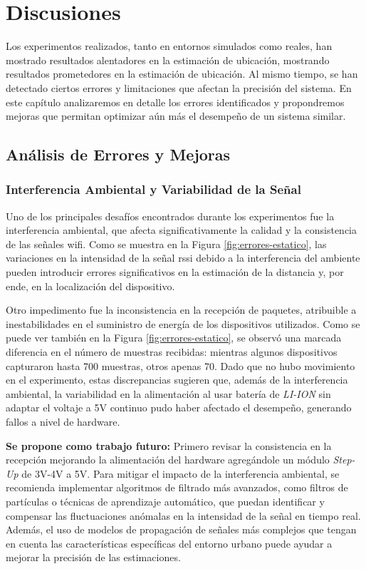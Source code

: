 \chapter{Discusiones}
\label{Cap_Errores}
\label{Capitulo_5}

Los experimentos realizados, tanto en entornos simulados como reales, han mostrado resultados alentadores en la estimación de ubicación, mostrando resultados prometedores en la estimación de ubicación. Al mismo tiempo, se han detectado ciertos errores y limitaciones que afectan la precisión del sistema. En este capítulo analizaremos en detalle los errores identificados y propondremos mejoras que permitan optimizar aún más el desempeño de un sistema similar.


\section{Análisis de Errores y Mejoras}

\subsection{Interferencia Ambiental y Variabilidad de la Señal}

Uno de los principales desafíos encontrados durante los experimentos fue la interferencia ambiental, que afecta significativamente la calidad y la consistencia de las señales \acs{wifi}. Como se muestra en la Figura \ref{fig:errores-estatico}, las variaciones en la intensidad de la señal \acs{rssi} debido a la interferencia del ambiente pueden introducir errores significativos en la estimación de la distancia y, por ende, en la localización del dispositivo.

Otro impedimento fue la inconsistencia en la recepción de paquetes, atribuible a inestabilidades en el suministro de energía de los dispositivos utilizados. Como se puede ver también en la Figura \ref{fig:errores-estatico}, se observó una marcada diferencia en el número de muestras recibidas: mientras algunos dispositivos capturaron hasta 700 muestras, otros apenas 70. Dado que no hubo movimiento en el experimento, estas discrepancias sugieren que, además de la interferencia ambiental, la variabilidad en la alimentación al usar batería de \textit{LI-ION} sin adaptar el voltaje a 5V continuo pudo haber afectado el desempeño, generando fallos a nivel de hardware.

\textbf{Se propone como trabajo futuro:}
Primero revisar la consistencia en la recepción mejorando la alimentación del hardware agregándole un módulo \textit{Step-Up} de 3V-4V a 5V. Para mitigar el impacto de la interferencia ambiental, se recomienda implementar algoritmos de filtrado más avanzados, como filtros de partículas o técnicas de aprendizaje automático, que puedan identificar y compensar las fluctuaciones anómalas en la intensidad de la señal en tiempo real. Además, el uso de modelos de propagación de señales más complejos que tengan en cuenta las características específicas del entorno urbano puede ayudar a mejorar la precisión de las estimaciones.

